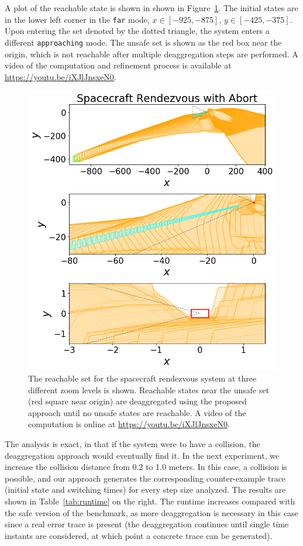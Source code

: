 A plot of the reachable state is shown in shown in Figure~\ref{fig:rendezvous}.
%
The initial states are in the lower left corner in the \texttt{far} mode,
$x \in [-925, -875]$, $y \in [-425, -375]$.
%
Upon entering the set denoted by the dotted triangle,
the system enters a different \texttt{approaching} mode.
%
The unsafe set is shown as the red box near the origin, which is not reachable after multiple deaggregation steps are performed.
%
A video of the computation and refinement process is available at \url{https://youtu.be/iXJlJnsxeN0}.

\begin{figure}[t]
\centerline{\includegraphics[width=0.8\columnwidth]{images/rendezvous.png}}
\vspace{-0.2cm}
\caption{{ The reachable set for the spacecraft rendezvous system at three different zoom levels is shown.
  Reachable states near the unsafe set (red square near origin) are deaggregated using the proposed approach until no unsafe states are reachable.
A video of the computation is online at \url{https://youtu.be/iXJlJnsxeN0}.}}
\label{fig:rendezvous}
\end{figure}

The analysis is exact, in that if the system were to have a collision, the deaggregation approach would eventually find it.
%
In the next experiment, we increase the collision distance from 0.2 to 1.0 meters.
%
In this case, a collision is possible, and our approach generates the corresponding counter-example trace (initial state and switching times)
for every step size analyzed.
%
The results are shown in Table~\ref{tab:runtime} on the right.
%
The runtime increases compared with the safe version of the benchmark, as more deaggregation is necessary in this case since a real error trace is
present (the deaggregation continues until single time instants are considered, at which point a concrete trace can be generated).

